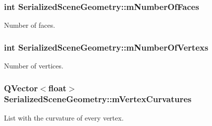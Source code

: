 \hypertarget{class_serialized_scene_geometry_a1526976e28d085ca2677d56cf395dfd6}{
\subsubsection[{m\+Number\+Of\+Faces}]{\setlength{\rightskip}{0pt plus 5cm}int Serialized\+Scene\+Geometry\+::m\+Number\+Of\+Faces\hspace{0.3cm}{\ttfamily [private]}}}\label{class_serialized_scene_geometry_a1526976e28d085ca2677d56cf395dfd6}


Number of faces. 

\hypertarget{class_serialized_scene_geometry_ae1a661fbede75f45b394cf148eca7ff7}{
\subsubsection[{m\+Number\+Of\+Vertexs}]{\setlength{\rightskip}{0pt plus 5cm}int Serialized\+Scene\+Geometry\+::m\+Number\+Of\+Vertexs\hspace{0.3cm}{\ttfamily [private]}}}\label{class_serialized_scene_geometry_ae1a661fbede75f45b394cf148eca7ff7}


Number of vertices. 

\hypertarget{class_serialized_scene_geometry_aec2daaca28e73a73128c926d2e4a5dcf}{
\subsubsection[{m\+Vertex\+Curvatures}]{\setlength{\rightskip}{0pt plus 5cm}Q\+Vector$<$float$>$ Serialized\+Scene\+Geometry\+::m\+Vertex\+Curvatures\hspace{0.3cm}{\ttfamily [private]}}}\label{class_serialized_scene_geometry_aec2daaca28e73a73128c926d2e4a5dcf}


List with the curvature of every vertex. 

